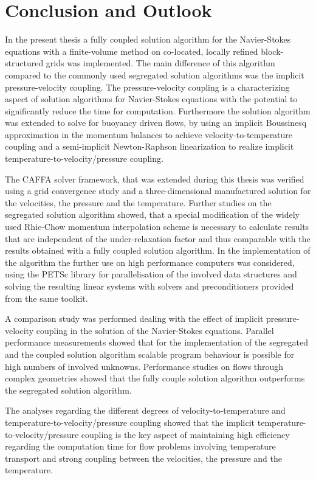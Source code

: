 \section{Conclusion and Outlook}

In the present thesis a fully coupled solution algorithm for the Navier-Stokes equations with a finite-volume method on co-located, locally refined block-structured grids was implemented. The main difference of this algorithm compared to the commonly used segregated solution algorithms was the implicit pressure-velocity coupling. The pressure-velocity coupling is a characterizing aspect of solution algorithms for Navier-Stokes equations with the potential to significantly reduce the time for computation. Furthermore the solution algorithm was extended to solve for buoyancy driven flows, by using an implicit Boussinesq approximation in the momentum balances to achieve velocity-to-temperature coupling and a semi-implicit Newton-Raphson linearization to realize implicit temperature-to-velocity/pressure coupling.

The CAFFA solver framework, that was extended during this thesis was verified using a grid convergence study and a three-dimensional manufactured solution for the velocities, the pressure and the temperature. Further studies on the segregated solution algorithm showed, that a special modification of the widely used Rhie-Chow momentum interpolation scheme is necessary to calculate results that are independent of the under-relaxation factor and thus comparable with the results obtained with a fully coupled solution algorithm. In the implementation of the algorithm the further use on high performance computers was considered, using the PETSc library for parallelisation of the involved data structures and solving the resulting linear systems with solvers and preconditioners provided from the same toolkit.

A comparison study was performed dealing with the effect of implicit pressure-velocity coupling in the solution of the Navier-Stokes equations. Parallel performance measurements showed that for the implementation of the segregated and the coupled solution algorithm scalable program behaviour is possible for high numbers of involved unknowns. Performance studies on flows through complex geometries showed that the fully couple solution algorithm outperforms the segregated solution algorithm. 

The analyses regarding the different degrees of velocity-to-temperature and temperature-to-velocity/pressure coupling showed that the implicit temperature-to-velocity/pressure coupling is the key aspect of maintaining high efficiency regarding the computation time for flow problems involving temperature transport and strong coupling between the velocities, the pressure and the temperature.

